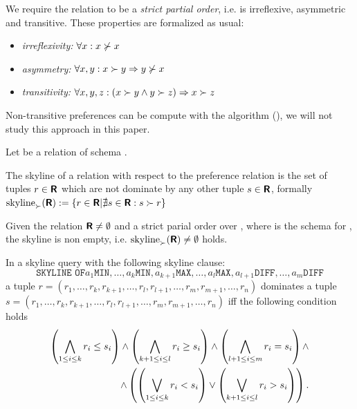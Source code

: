 We require the relation \dominates to be a \emph{strict partial order}, i.e. \dominates is irreflexive, asymmetric and transitive. These properties are formalized as usual:

\begin{itemize}
\item \emph{irreflexivity:} $\forall x: x \not\succ x$
\item \emph{asymmetry:} $\forall x, y: x \succ y \Rightarrow y \not\succ x$
\item \emph{transitivity:} $\forall x, y, z: (x \succ y \land y \succ z) \Rightarrow x \succ z$
\end{itemize}

Non-transitive preferences can be compute with the  algorithm (\citep{Torlone2002, Ciaccia2004}), we will not study this approach in this paper.

\begin{definition}
\todo{}{}Let  be a relation of schema .
\end{definition}

\begin{definition}[Skyline]
The skyline of a relation  with respect to the preference relation \dominates is the set of tuples $r \in \textnormal{\bf\textsf{R}}$ which are not dominate by any other tuple $s \in \textnormal{\bf\textsf{R}}$, formally $\skyline_\dominates(\relation{R}) := \{ r \in \relation{R} | \nexists s \in \relation{R} : s \dominates r \}$
\end{definition}

\begin{lemma}
Given the relation $\textnormal{\bf\textsf{R}} \not= \emptyset$ and \dominates a strict parial order over , where  is the schema for , the skyline is non empty, i.e. $\skyline_\dominates(\relation{R}) \not= \emptyset$ holds.
\end{lemma}


In a skyline query with the following skyline clause:
\[
\texttt{SKYLINE OF} a_1 \texttt{MIN}, \ldots, a_k \texttt{MIN}, a_{k+1} \texttt{MAX}, \ldots, a_l \texttt{MAX}, a_{l+1} \texttt{DIFF}, \ldots, a_m \texttt{DIFF}
\]
a tuple 
$r = (r_1, \ldots, r_k, r_{k+1}, \ldots, r_l, r_{l+1}, \ldots, r_m, r_{m+1}, \ldots, r_n)$
dominates a tuple
$s = (r_1, \ldots, r_k, r_{k+1}, \ldots, r_l, r_{l+1}, \ldots, r_m, r_{m+1}, \ldots, r_n)$
iff the following condition holds
\begin{eqnarray}\label{equ:skylinepf}
\left( \bigwedge_{1 \le i \le k} r_i \le s_i \right) \land
\left( \bigwedge_{k+1 \le i \le l} r_i \ge s_i \right) \land
\left( \bigwedge_{l+1 \le i \le m} r_i = s_i \right) \land \nonumber\\
\land
\left( \left( \bigvee_{1 \le i \le k} r_i < s_i \right) \lor
       \left( \bigvee_{k+1 \le i \le l} r_i > s_i \right) \right).
\end{eqnarray}


